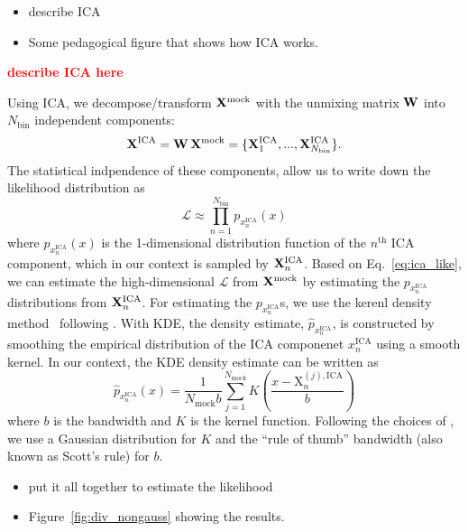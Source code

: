 \documentclass[12pt, letterpaper, preprint]{aastex}
\newcommand{\bitem}{\begin{itemize}}
\newcommand{\eitem}{\end{itemize}}
\newcommand{\beq}{\begin{equation}}
\newcommand{\eeq}{\end{equation}}
\newcommand{\todo}[1]{{\bf \textcolor{red}{#1}}}
\newcommand{\Xmock}{{\bf X}^\mathrm{mock}}
\begin{document}
\bitem
    \item describe ICA 
    \item Some pedagogical figure that shows how ICA works. 
\eitem
\todo{describe ICA here} 

Using ICA, we decompose/transform $\Xmock$ with the unmixing matrix ${\bf W}$ 
into $N_\mathrm{bin}$ independent components: 
\beq
{\bf X}^\mathrm{ICA} = {\bf W}\,\Xmock = \{{\bf X}^\mathrm{ICA}_1, ..., {\bf X}^\mathrm{ICA}_{N_\mathrm{bin}}\}.
\eeq
The statistical indpendence of these components, allow us to write 
down the likelihood distribution as 
\beq \label{eq:ica_like}
\mathcal{L} \approx \prod\limits_{n=1}^{N_\mathrm{bin}} p_{x^\mathrm{ICA}_n} (x) 
\eeq
where $p_{x^\mathrm{ICA}_n} (x)$ is the 1-dimensional distribution 
function of the $n^\mathrm{th}$ ICA component, which in our context 
is sampled by ${\bf X}^\mathrm{ICA}_n$. Based on Eq.~\ref{eq:ica_like}, 
we can estimate the high-dimensional $\mathcal{L}$ 
from $\Xmock$ by estimating the $p_{x^\mathrm{ICA}_n}$ distributions 
from ${\bf X}^\mathrm{ICA}_n$. For estimating the $p_{x^\mathrm{ICA}_n}$s, 
we use the kerenl density method~\citep[hereafter KDE; \emph{e.g.}][]{9780387848587,feigelson2012}
following \cite{hartlap2009}. With KDE, the density estimate,
$\hat{p}_{x^\mathrm{ICA}_n}$, is constructed by 
smoothing the empirical distribution of the ICA componenet $x^\mathrm{ICA}_n$ 
using a smooth kernel. In our context, the KDE density estimate 
can be written as 
\beq
\hat{p}_{x^\mathrm{ICA}_n}(x) = \frac{1}{N_\mathrm{mock}b} \sum\limits_{j=1}^{N_\mathrm{mock}} K \left( \frac{x - \mathrm{X}^{(j),\mathrm{ICA}}_n}{b} \right)
\eeq
where $b$ is the bandwidth and $K$ is the kernel function. Following the 
choices of \cite{hartlap2009}, we use a Gaussian distribution for $K$ and the 
``rule of thumb'' bandwidth (also known as Scott's rule) for $b$.   


\bitem
    \item put it all together to estimate the likelihood
    \item Figure~\ref{fig:div_nongauss} showing the results.
\eitem
\end{document}

